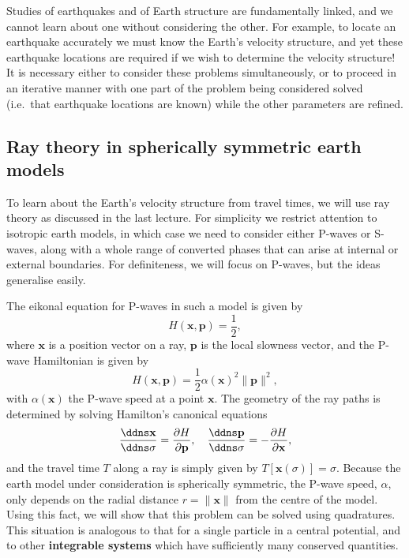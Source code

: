 Studies of earthquakes and of Earth structure are fundamentally linked, and we cannot learn about one without considering the other.
 For example, to locate an earthquake accurately 
we must know the Earth's velocity structure, and yet these earthquake locations are required if we wish to determine the velocity 
structure! It is necessary 
either to consider these problems simultaneously, or to proceed in an iterative manner with one part of the problem being 
considered solved (i.e.\ that earthquake locations 
are known) while the other parameters are refined.

\subsection*{Ray theory in spherically symmetric earth models}

To learn about the Earth's velocity structure from travel times, we will use ray theory as discussed in the last lecture.
  For simplicity we restrict attention 
to isotropic earth models, in which case we need to consider either P-waves or S-waves, along with a whole
range of converted phases that can arise at internal or external boundaries. For definiteness, we will focus on P-waves, 
but the ideas generalise easily.

The eikonal equation for P-waves in such a model is given by
\begin{equation}
H(\mathbf{x},\mathbf{p})=\frac{1}{2},
\label{eq:3}
\end{equation}
where $\mathbf{x}$ is a position vector on a ray, $\mathbf{p}$ is the local slowness vector, and the P-wave Hamiltonian is given by
\begin{equation}
H(\mathbf{x},\mathbf{p})=\frac{1}{2}\alpha(\mathbf{x})^{2}\|\mathbf{p}\|^{2},
\label{eq:4}
\end{equation}
with $\alpha(\mathbf{x})$ the P-wave speed at a point $\mathbf{x}$. The geometry of the ray paths is determined by solving Hamilton's canonical equations
\begin{equation}
\frac{\ddns \mathbf{x}}{\ddns \sigma}=\frac{\partial H}{\partial \mathbf{p}},\quad \frac{\ddns \mathbf{p}}{\ddns \sigma}=-\frac{\partial H}{\partial \mathbf{x}},
\label{eq:5}
\end{equation}
and the travel time $T$ along a ray is simply given by $T[\mathbf{x}(\sigma)]=\sigma$. Because the earth model under 
consideration is spherically symmetric, the P-wave speed, 
$\alpha$, only depends on the radial distance $r=\|\mathbf{x}\|$ from the centre of the model. Using this fact, we will show that 
this problem can be solved using quadratures. 
This situation is analogous to that for a single particle in a central potential, and to other \textbf{integrable systems}
 which have sufficiently many conserved quantities.


